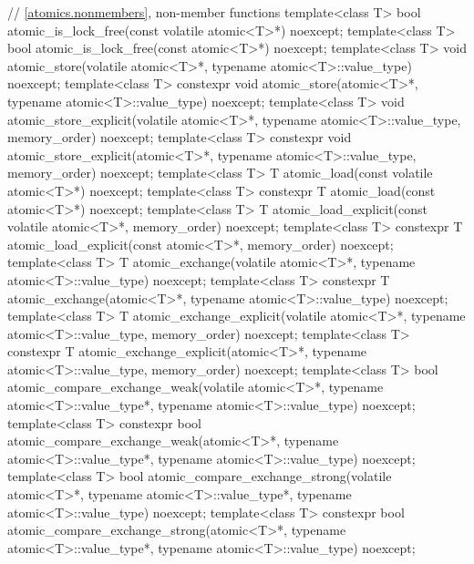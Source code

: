 \begin{codeblock}
{  // \ref{atomics.nonmembers}, non-member functions
  template<class T>
    bool atomic_is_lock_free(const volatile atomic<T>*) noexcept;
  template<class T>
    bool atomic_is_lock_free(const atomic<T>*) noexcept;
  template<class T>
    void atomic_store(volatile atomic<T>*, typename atomic<T>::value_type) noexcept;
  template<class T>
    constexpr void atomic_store(atomic<T>*, typename atomic<T>::value_type) noexcept;
  template<class T>
    void atomic_store_explicit(volatile atomic<T>*, typename atomic<T>::value_type,
                               memory_order) noexcept;
  template<class T>
    constexpr void atomic_store_explicit(atomic<T>*, typename atomic<T>::value_type,
                                         memory_order) noexcept;
  template<class T>
    T atomic_load(const volatile atomic<T>*) noexcept;
  template<class T>
    constexpr T atomic_load(const atomic<T>*) noexcept;
  template<class T>
    T atomic_load_explicit(const volatile atomic<T>*, memory_order) noexcept;
  template<class T>
    constexpr T atomic_load_explicit(const atomic<T>*, memory_order) noexcept;
  template<class T>
    T atomic_exchange(volatile atomic<T>*, typename atomic<T>::value_type) noexcept;
  template<class T>
    constexpr T atomic_exchange(atomic<T>*, typename atomic<T>::value_type) noexcept;
  template<class T>
    T atomic_exchange_explicit(volatile atomic<T>*, typename atomic<T>::value_type,
                               memory_order) noexcept;
  template<class T>
    constexpr T atomic_exchange_explicit(atomic<T>*, typename atomic<T>::value_type,
                                         memory_order) noexcept;
  template<class T>
    bool atomic_compare_exchange_weak(volatile atomic<T>*,
                                      typename atomic<T>::value_type*,
                                      typename atomic<T>::value_type) noexcept;
  template<class T>
    constexpr bool atomic_compare_exchange_weak(atomic<T>*,
                                                typename atomic<T>::value_type*,
                                                typename atomic<T>::value_type) noexcept;
  template<class T>
    bool atomic_compare_exchange_strong(volatile atomic<T>*,
                                        typename atomic<T>::value_type*,
                                        typename atomic<T>::value_type) noexcept;
  template<class T>
    constexpr bool atomic_compare_exchange_strong(atomic<T>*,
                                                  typename atomic<T>::value_type*,
                                                  typename atomic<T>::value_type) noexcept;
}
\end{codeblock}
